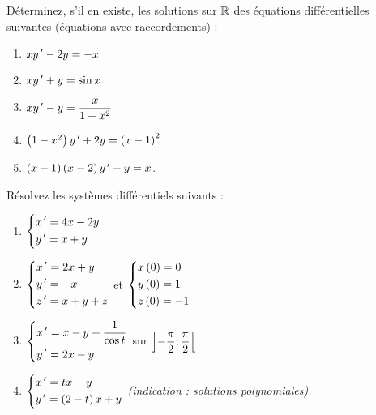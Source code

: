 \begin{exoss}
Déterminez, s'il en existe, les solutions sur \(\mathbb{R}\) des équations différentielles suivantes (équations avec raccordements) :

\begin{enumerate}
    \item \(xy^{\,\prime}-2y=-x\) \\
    \item \(xy^{\,\prime}+y=\sin x\) \\
    \item \(xy^{\,\prime}-y=\dfrac{x}{1+x^2}\) \\
    \item \(\left(1-x^2\right)y^{\,\prime}+2y=\left(x-1\right)^2\) \\
    \item \(\left(x-1\right)\left(x-2\right)y^{\,\prime}-y=x\).
\end{enumerate}
\end{exoss}

\begin{exos}
Résolvez les systèmes différentiels suivants :

\begin{enumerate}
    \item \(\begin{dcases}
        x^{\,\prime}=4x-2y \\
        y^{\,\prime}=x+y
    \end{dcases}\) \\
    \item \(\begin{dcases}
        x^{\,\prime}=2x+y \\
        y^{\,\prime}=-x \\
        z^{\,\prime}=x+y+z
    \end{dcases}\) et \(\begin{dcases}
        x\left(0\right)=0 \\
        y\left(0\right)=1 \\
        z\left(0\right)=-1
    \end{dcases}\) \\
    \item \(\begin{dcases}
        x^{\,\prime}=x-y+\dfrac{1}{\cos t} \\
        y^{\,\prime}=2x-y
    \end{dcases}\) sur \(\left]-\dfrac{\pi}{2};\dfrac{\pi}{2}\right[\) \\
    \item \(\begin{dcases}
        x^{\,\prime}=tx-y \\
        y^{\,\prime}=\left(2-t\right)x+y
    \end{dcases}\) \textit{(indication : solutions polynomiales).}
\end{enumerate}
\end{exos}

